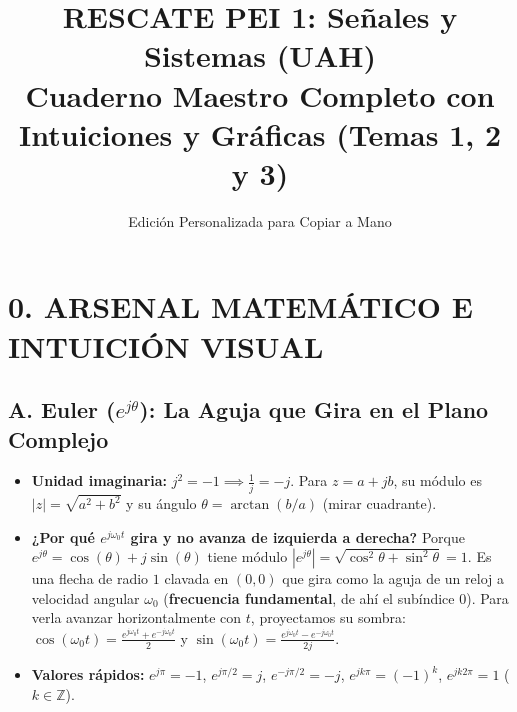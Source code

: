 \documentclass[10pt,a4paper]{article}
\title{\textbf{RESCATE PEI 1: Señales y Sistemas (UAH)} \\ \large Cuaderno Maestro Completo con Intuiciones y Gráficas (Temas 1, 2 y 3)}
\author{Edición Personalizada para Copiar a Mano}
\date{}
\begin{document}
	\maketitle
	
	\section*{0. ARSENAL MATEMÁTICO E INTUICIÓN VISUAL}
	
	\subsection*{A. Euler ($e^{j\theta}$): La Aguja que Gira en el Plano Complejo}
	\begin{itemize}
		\item \textbf{Unidad imaginaria:} $j^2 = -1 \implies \frac{1}{j} = -j$. Para $z = a + jb$, su módulo es $|z| = \sqrt{a^2+b^2}$ y su ángulo $\theta = \arctan(b/a)$ (mirar cuadrante).
		\item \textbf{¿Por qué $e^{j\omega_0 t}$ gira y no avanza de izquierda a derecha?} Porque $e^{j\theta} = \cos(\theta) + j\sin(\theta)$ tiene módulo $|e^{j\theta}| = \sqrt{\cos^2\theta + \sin^2\theta} = 1$. Es una flecha de radio $1$ clavada en $(0,0)$ que gira como la aguja de un reloj a velocidad angular $\omega_0$ (\textbf{frecuencia fundamental}, de ahí el subíndice $0$). Para verla avanzar horizontalmente con $t$, proyectamos su sombra: $\cos(\omega_0 t) = \frac{e^{j\omega_0 t}+e^{-j\omega_0 t}}{2}$ y $\sin(\omega_0 t) = \frac{e^{j\omega_0 t}-e^{-j\omega_0 t}}{2j}$.
		\item \textbf{Valores rápidos:} $e^{j\pi} = -1$, \quad $e^{j\pi/2} = j$, \quad $e^{-j\pi/2} = -j$, \quad $e^{jk\pi} = (-1)^k$, \quad $e^{jk2\pi} = 1$ ($k \in \mathbb{Z}$).
	\end{itemize}
	
\end{document}
